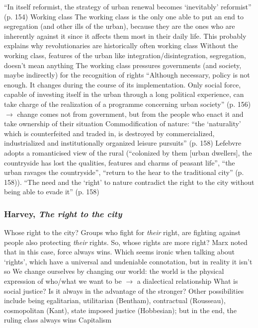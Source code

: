 \documentclass{article}
\begin{document}
\begin{outline}
	\1 ``In itself reformist, the strategy of urban renewal becomes `inevitably' reformist'' (p. 154)
	\1 Working class
		\2 The working class is the only one able to put an end to segregation (and other ills of the urban), because they are the ones who are inherently against it since it affects them most in their daily life. This probably explains why revolutionaries are historically often working class
		\2 Without the working class, features of the urban like integration/disintegration, segregation, doesn't mean anything
		\2 The working class pressures governments (and society, maybe indirectly) for the recognition of rights 
	\1 ``Although necessary, policy is not enough. It changes during the course of its implementation. Only social force, capable of investing itself in the urban through a long political experience, can take charge of the realization of a programme concerning urban society'' (p. 156) $\rightarrow$ change comes not from government, but from the people who enact it and take ownership of their situation
	\1 Commodification of nature: ``the `naturality' which is counterfeited and traded in, is destroyed by commercialized, industrialized and institutionally organized leisure pursuits'' (p. 158)
	\1 Lefebvre adopts a romanticised view of the rural (``colonized by them [urban dwellers], the countryside has lost the qualities, features and charms of peasant life'', ``the urban ravages the countryside'', ``return to the hear to the traditional city'' (p. 158)). 
	\1 ``The need and the `right' to nature contradict the right to the city without being able to evade it'' (p. 158) 
\end{outline}

\subsubsection{Harvey, \textit{The right to the city}}

\begin{outline}
	\1 Whose right to the city? Groups who fight for \textit{their} right, are fighting against people also protecting \textit{their} rights. So, whose rights are more right? Marx noted that in this case, force always wins. Which seems ironic when talking about `rights', which have a universal and undeniable connotation, but in reality it isn't so
	\1 We change ourselves by changing our world: the world is the physical expression of who/what we want to be $\rightarrow$ a dialectical relationship
	\1 What is social justice? Is it always in the advantage of the stronger? Other possibilities include being egalitarian, utilitarian (Bentham), contractual (Rousseau), cosmopolitan (Kant), state imposed justice (Hobbesian); but in the end, the ruling class always wins
	\1 Capitalism
\end{outline}
\end{document}
